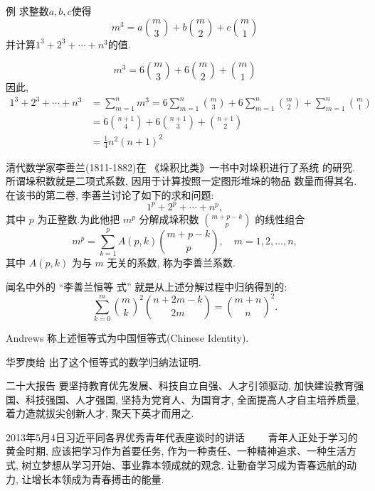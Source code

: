 \documentclass[10pt,punct]{ctexbeamer}
\begin{document}
\begin{frame}
\begin{block}{例}
    求整数$a,b,c$使得\[m^{3}=a\binom{m}{3}+b\binom{m}{2}+c\binom{m}{1}\tag{*}\]并计算$1^{3}+2^{3}+\cdots+n^{3}$的值.
\end{block}
\[m^{3}=6\binom{m}{3}+6\binom{m}{2}+\binom{m}{1}\]
因此,
\begin{align*}
    1^{3}+2^{3}+\cdots+n^{3} &=\sum_{m=1}^{n} m^{3}
    =6 \sum_{m=1}^{n}\binom{m}{3} +6 \sum_{m=1}^{n} \binom{m}{2}+\sum_{m=1}^{n}\binom{m}{1}\\
    &=6\binom{n+1}{4}+6\binom{n+1}{3}+\binom{n+1}{2} \\
    &=\frac{1}{4} n^{2}(n+1)^{2}
\end{align*}
\end{frame}

\begin{frame}
清代数学家李善兰(1811-1882)在 《垛积比类》一书中对垛积进行了系统 的研究.所谓垛积数就是二项式系数, 因用于计算按照一定图形堆垛的物品 数量而得其名.在该书的第二卷, 李善兰讨论了如下的求和问题:
$$
1^p+2^p+\cdots+n^p,
$$
其中 $p$ 为正整数.为此他把 $m^p$ 分解成垛积数 $\binom{ m+p-k}{p}$ 的线性组合
$$
m^p=\sum_{k=1}^p A(p, k) \binom{ m+p-k}{p}, \quad m=1,2, \ldots, n,
$$
其中 $A(p, k)$ 为与 $m$ 无关的系数, 称为李善兰系数.

闻名中外的 “李善兰恒等 式” 就是从上述分解过程中归纳得到的:
$$
\sum_{k=0}^m \binom{m}{k}^2
\binom{n+2 m-k}{2 m}
=\binom{m+n
}{n}^2 .
$$

Andrews 称上述恒等式为中国恒等式(Chinese Identity).

华罗庚给 出了这个恒等式的数学归纳法证明.
\end{frame}


\begin{frame}
\begin{block}{二十大报告}
要坚持教育优先发展、科技自立自强、人才引领驱动,
加快建设教育强国、科技强国、人才强国,
坚持为党育人、为国育才,
全面提高人才自主培养质量,
着力造就拔尖创新人才,
聚天下英才而用之.
\end{block}


\begin{block}{2013年5月4日习近平同各界优秀青年代表座谈时的讲话}
   　　青年人正处于学习的黄金时期, 应该把学习作为首要任务, 作为一种责任、一种精神追求、一种生活方式, 树立梦想从学习开始、事业靠本领成就的观念, 让勤奋学习成为青春远航的动力, 让增长本领成为青春搏击的能量.
\end{block}
\end{frame}
\end{document}
